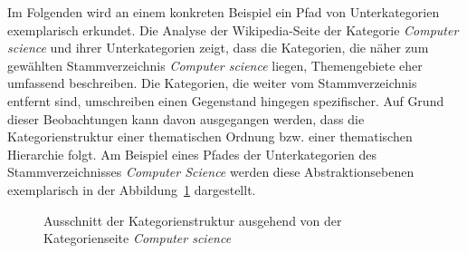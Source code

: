 Im Folgenden wird an einem konkreten Beispiel ein Pfad von Unterkategorien exemplarisch erkundet.
Die Analyse der Wikipedia-Seite der Kategorie \emph{Computer science} und ihrer Unterkategorien zeigt, dass die Kategorien, die näher zum gewählten Stammverzeichnis \emph{Computer science} liegen, Themengebiete eher umfassend beschreiben.
Die Kategorien, die weiter vom Stammverzeichnis entfernt sind, umschreiben einen Gegenstand hingegen spezifischer.
Auf Grund dieser Beobachtungen kann davon ausgegangen werden, dass die Kategorienstruktur einer thematischen Ordnung bzw. einer thematischen Hierarchie folgt.
Am Beispiel eines Pfades der Unterkategorien des Stammverzeichnisses \emph{Computer Science} werden diese Abstraktionsebenen exemplarisch in der Abbildung~\ref{fig:cs-tree} dargestellt.

\begin{figure}
    \centering
    \caption{Ausschnitt der Kategorienstruktur ausgehend von der Kategorienseite \emph{Computer science}}
    \label{fig:cs-tree}
\end{figure}

